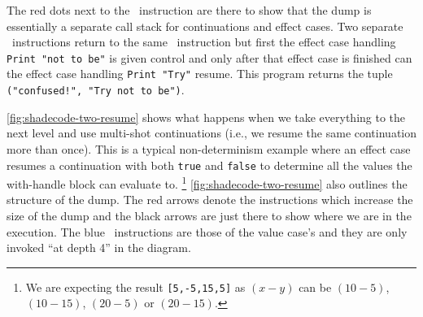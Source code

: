 \documentclass[class=article, crop=false]{standalone}
\begin{document}
The red dots next to the \vmApply\ instruction are there to show that the dump
is essentially a separate call stack for continuations and effect cases.
Two separate \vmRett\ instructions return to the same \vmApply\ instruction
but first the effect case handling \lstinline{Print "not to be"} is given
control and only after that effect case is finished can the effect case handling
\lstinline{Print "Try"} resume. This program returns the tuple
\lstinline|("confused!", "Try not to be")|.

 

\autoref{fig:shadecode-two-resume} shows what happens when we take everything to
the next level and use multi-shot continuations (i.e., we resume the same
continuation more than once). This is a typical non-determinism example where
an effect case resumes a continuation with both \lstinline{true} and
\lstinline{false} to determine all the values the with-handle block can evaluate
to. \footnote{We are expecting the result \lstinline{[5,-5,15,5]} as $(x-y)$
can be $(10-5)$, $(10-15)$, $(20-5)$ or $(20-15)$.}
\autoref{fig:shadecode-two-resume} also outlines the structure of the dump.
The red arrows denote the instructions which increase the size of the dump and
the black arrows are just there to show where we are in the execution.
The blue \vmRett\ instructions are those of the value case's and they are only
invoked ``at depth 4'' in the diagram.
\end{document}
